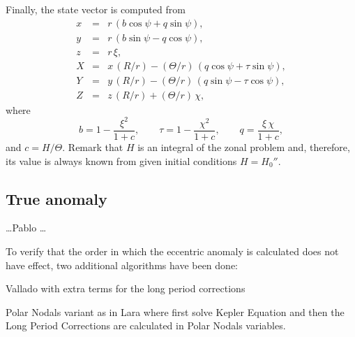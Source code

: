 \documentclass{article}
\begin{document}
Finally, the state vector is computed from
\begin{eqnarray*} \label{ns2x}
x &=& r\,(b\cos\psi+q\sin\psi), \\ \label{ns2y}
y &=& r\,(b\sin\psi-q\cos\psi), \\
z &=& r\,\xi, \\
X &=& x\,(R/r) %
 - ({\Theta}/{r})\,(q\cos\psi+\tau\sin\psi), \\ \label{ns2Y}
Y &=& y\,(R/r) %
 - ({\Theta}/{r})\,(q\sin\psi-\tau\cos\psi), \\  \label{ns2zz}
Z &=& z\,(R/r)+(\Theta/r)\,\chi,
\end{eqnarray*}
where
\[%
b=1-\frac{\xi^2}{1+c}, \qquad
\tau=1 - \frac{\chi^2}{1 + c}, \qquad
q=\frac{\xi\,\chi}{1+c},
\]%
and $c=H/\Theta$. Remark that $H$ is an integral of the zonal problem and, therefore, its value is always known from given initial conditions $H=H_0''$.




\subsection{True anomaly} \label{sec:trueanomaly}

{\color{red}\dots Pablo \dots}

To verify that the order in which the eccentric anomaly is calculated does not have effect,
two additional algorithms have been done:

Vallado with extra terms for the long period corrections

Polar Nodals variant as in Lara where first solve Kepler Equation and then the Long Period Corrections are calculated in Polar Nodals variables.



\end{document}
